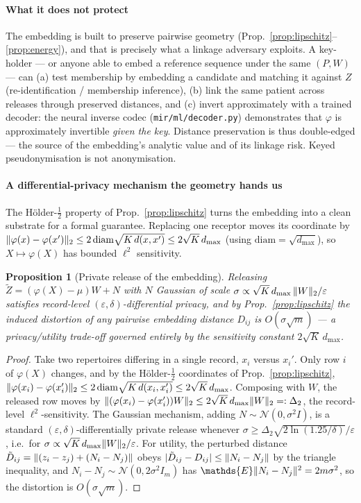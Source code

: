 \documentclass[11pt]{article}
\theoremstyle{oldplain}
\newtheorem{proposition}{Proposition}
\theoremstyle{oldrem}
\newcommand{\E}{\mathds{E}}
\newcommand{\code}[1]{\texttt{#1}}
\DeclarePairedDelimiter{\norm}{\lVert}{\rVert}
\begin{document}
\paragraph{What it does not protect} The embedding is built to preserve pairwise geometry
(Prop.~\ref{prop:lipschitz}--\ref{prop:energy}), and that is precisely what a linkage adversary exploits. A
key-holder --- or anyone able to embed a reference sequence under the same $(P,W)$ --- can (a) test
membership by embedding a candidate and matching it against $Z$ (re-identification / membership inference),
(b) link the same patient across releases through preserved distances, and (c) invert approximately with a
trained decoder: the neural inverse codec (\code{mir/ml/decoder.py}) demonstrates that $\varphi$ is
approximately invertible \emph{given the key}. Distance preservation is thus double-edged --- the source of
the embedding's analytic value and of its linkage risk. Keyed pseudonymisation is not anonymisation.

\paragraph{A differential-privacy mechanism the geometry hands us} The H\"older-$\tfrac12$ property of
Prop.~\ref{prop:lipschitz} turns the embedding into a clean substrate for a formal guarantee. Replacing one
receptor moves its coordinate by $\norm{\varphi(x)-\varphi(x')}_2\le 2\,\mathrm{diam}\sqrt{K\,d(x,x')}
\le 2\sqrt K\,d_{\max}$ (using $\mathrm{diam}=\sqrt{d_{\max}}$), so $X\mapsto\varphi(X)$ has bounded
$\ell^2$ sensitivity.

\begin{proposition}[Private release of the embedding]\label{prop:dp}
Releasing $\tilde Z=(\varphi(X)-\mu)W+N$ with $N$ Gaussian of scale
$\sigma\propto \sqrt K\,d_{\max}\,\norm{W}_2/\varepsilon$ satisfies record-level
$(\varepsilon,\delta)$-differential privacy, and by Prop.~\ref{prop:lipschitz} the induced distortion of any
pairwise embedding distance $D_{ij}$ is $O(\sigma\sqrt m)$ --- a privacy/utility trade-off governed entirely
by the sensitivity constant $2\sqrt K\,d_{\max}$.
\end{proposition}
\begin{proof}
Take two repertoires differing in a single record, $x_i$ versus $x_i'$. Only row $i$ of $\varphi(X)$ changes,
and by the H\"older-$\tfrac12$ coordinates of Prop.~\ref{prop:lipschitz},
$\norm{\varphi(x_i)-\varphi(x_i')}_2\le 2\,\mathrm{diam}\sqrt{K\,d(x_i,x_i')}\le 2\sqrt K\,d_{\max}$.
Composing with $W$, the
released row moves by $\norm{(\varphi(x_i)-\varphi(x_i'))W}_2\le 2\sqrt K\,d_{\max}\norm{W}_2=:\Delta_2$, the
record-level $\ell^2$-sensitivity. The Gaussian mechanism, adding $N\sim\mathcal N(0,\sigma^2 I)$, is a
standard $(\varepsilon,\delta)$-differentially private release whenever
$\sigma\ge\Delta_2\sqrt{2\ln(1.25/\delta)}/\varepsilon$, i.e.\ for
$\sigma\propto\sqrt K\,d_{\max}\norm{W}_2/\varepsilon$. For utility, the perturbed distance
$\tilde D_{ij}=\norm{(z_i-z_j)+(N_i-N_j)}$ obeys $\lvert\tilde D_{ij}-D_{ij}\rvert\le\norm{N_i-N_j}$ by the
triangle inequality, and $N_i-N_j\sim\mathcal N(0,2\sigma^2 I_m)$ has $\E\norm{N_i-N_j}^2=2m\sigma^2$, so the
distortion is $O(\sigma\sqrt m)$.
\end{proof}
\end{document}
